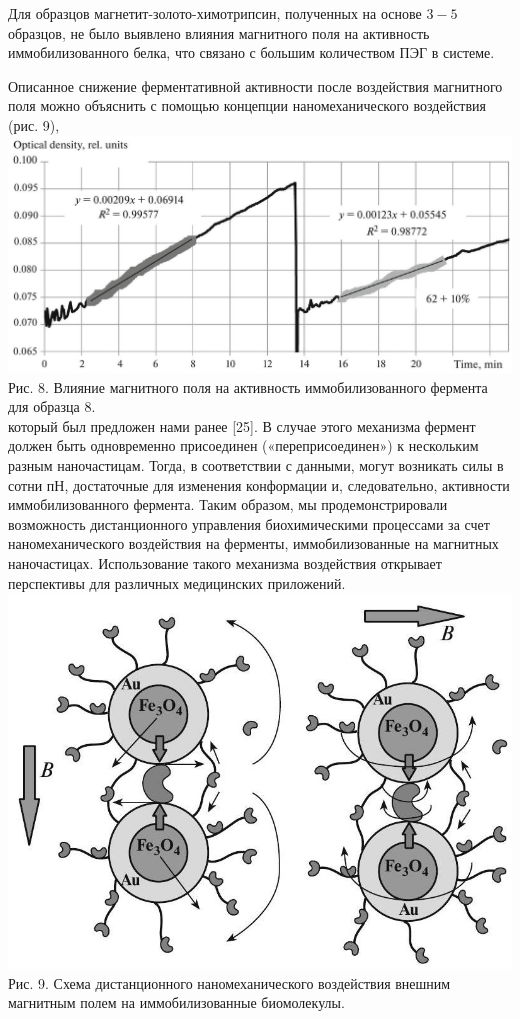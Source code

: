 \documentclass[12pt, a4paper]{article}
\begin{document}
Для образцов магнетит-золото-химотрипсин, полученных на основе \(3-5\) образцов, не было выявлено влияния магнитного поля на активность иммобилизованного белка, что связано с большим количеством ПЭГ в системе.

Описанное снижение ферментативной активности после воздействия магнитного поля можно объяснить с помощью концепции наномеханического воздействия (рис. 9),\\
\includegraphics[scale=0.35, center]{2024_10_23_dfdc0589534473f41785g-8(1)}
Рис. 8. Влияние магнитного поля на активность иммобилизованного фермента для образца 8.\\
который был предложен нами ранее [25]. В случае этого механизма фермент должен быть одновременно присоединен («переприсоединен») к нескольким разным наночастицам. Тогда, в соответствии с данными, могут возникать силы в сотни пН, достаточные для изменения конформации и, следовательно, активности иммобилизованного фермента.
Таким образом, мы продемонстрировали возможность дистанционного управления биохимическими процессами за счет наномеханического воздействия на ферменты, иммобилизованные на магнитных наночастицах. Использование такого механизма воздействия открывает перспективы для различных медицинских приложений.\\
\includegraphics[scale=0.5, center]{2024_10_23_dfdc0589534473f41785g-8}
Рис. 9. Схема дистанционного наномеханического воздействия внешним магнитным полем на иммобилизованные биомолекулы.
\end{document}
